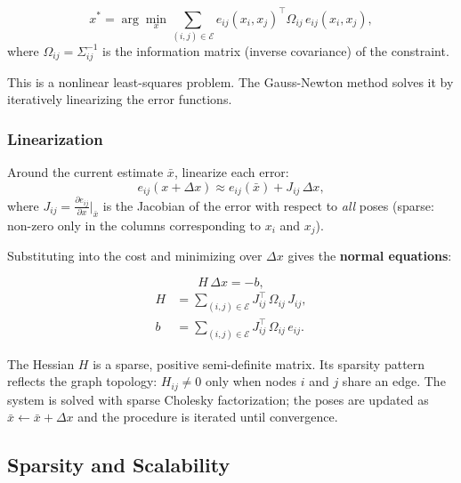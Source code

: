 \documentclass[11pt,a4paper]{article}
\theoremstyle{definition}
\theoremstyle{plain}
\theoremstyle{remark}
\begin{document}
\begin{tcolorbox}[colback=blue!5!white,colframe=blue!75!black,title=\textbf{SLAM Objective}]
\[
    x^* = \arg\min_{x} \sum_{(i,j) \in \mathcal{E}} e_{ij}(x_i, x_j)^{\top} \Omega_{ij}\, e_{ij}(x_i, x_j), %
\]
where $\Omega_{ij} = \Sigma_{ij}^{-1}$ is the information matrix (inverse covariance) of the constraint.
\end{tcolorbox}

This is a nonlinear least-squares problem. The Gauss-Newton method solves it by iteratively linearizing the error functions.

\subsubsection{Linearization}

Around the current estimate $\bar{x}$, linearize each error:
\[
    e_{ij}(x + \Delta x) \approx e_{ij}(\bar{x}) + J_{ij}\,\Delta x,
\]
where $J_{ij} = \frac{\partial e_{ij}}{\partial x}\big|_{\bar{x}}$ is the Jacobian of the error with respect to \emph{all} poses (sparse: non-zero only in the columns corresponding to $x_i$ and $x_j$).

Substituting into the cost and minimizing over $\Delta x$ gives the \textbf{normal equations}:

\begin{tcolorbox}[colback=blue!5!white,colframe=blue!75!black,title=\textbf{Normal Equations (Gauss-Newton)}]
\[
    H\,\Delta x = -b,
\]
\begin{align*}
    H &= \sum_{(i,j)\in\mathcal{E}} J_{ij}^\top\,\Omega_{ij}\,J_{ij}, \\
    b &= \sum_{(i,j)\in\mathcal{E}} J_{ij}^\top\,\Omega_{ij}\,e_{ij}.
\end{align*}
\end{tcolorbox}

The Hessian $H$ is a sparse, positive semi-definite matrix. Its sparsity pattern reflects the graph topology: $H_{ij} \ne 0$ only when nodes $i$ and $j$ share an edge. The system is solved with sparse Cholesky factorization; the poses are updated as $\bar{x} \leftarrow \bar{x} + \Delta x$ and the procedure is iterated until convergence.

\subsection{Sparsity and Scalability}
\end{document}
